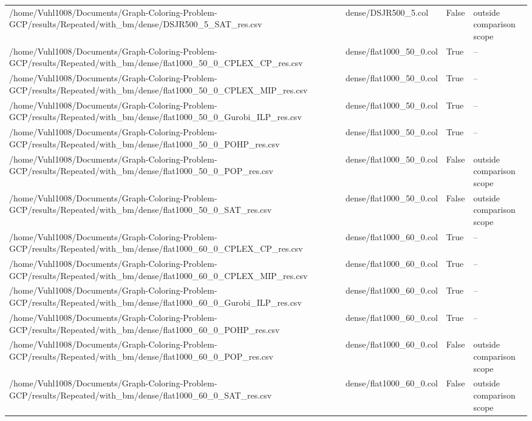 \begin{table}[htbp]
\begin{tabular}{llll}
/home/Vuhl1008/Documents/Graph-Coloring-Problem-GCP/results/Repeated/with\_bm/dense/DSJR500\_5\_SAT\_res.csv & dense/DSJR500\_5.col & False & outside comparison scope \\
/home/Vuhl1008/Documents/Graph-Coloring-Problem-GCP/results/Repeated/with\_bm/dense/flat1000\_50\_0\_CPLEX\_CP\_res.csv & dense/flat1000\_50\_0.col & True & -- \\
/home/Vuhl1008/Documents/Graph-Coloring-Problem-GCP/results/Repeated/with\_bm/dense/flat1000\_50\_0\_CPLEX\_MIP\_res.csv & dense/flat1000\_50\_0.col & True & -- \\
/home/Vuhl1008/Documents/Graph-Coloring-Problem-GCP/results/Repeated/with\_bm/dense/flat1000\_50\_0\_Gurobi\_ILP\_res.csv & dense/flat1000\_50\_0.col & True & -- \\
/home/Vuhl1008/Documents/Graph-Coloring-Problem-GCP/results/Repeated/with\_bm/dense/flat1000\_50\_0\_POHP\_res.csv & dense/flat1000\_50\_0.col & True & -- \\
/home/Vuhl1008/Documents/Graph-Coloring-Problem-GCP/results/Repeated/with\_bm/dense/flat1000\_50\_0\_POP\_res.csv & dense/flat1000\_50\_0.col & False & outside comparison scope \\
/home/Vuhl1008/Documents/Graph-Coloring-Problem-GCP/results/Repeated/with\_bm/dense/flat1000\_50\_0\_SAT\_res.csv & dense/flat1000\_50\_0.col & False & outside comparison scope \\
/home/Vuhl1008/Documents/Graph-Coloring-Problem-GCP/results/Repeated/with\_bm/dense/flat1000\_60\_0\_CPLEX\_CP\_res.csv & dense/flat1000\_60\_0.col & True & -- \\
/home/Vuhl1008/Documents/Graph-Coloring-Problem-GCP/results/Repeated/with\_bm/dense/flat1000\_60\_0\_CPLEX\_MIP\_res.csv & dense/flat1000\_60\_0.col & True & -- \\
/home/Vuhl1008/Documents/Graph-Coloring-Problem-GCP/results/Repeated/with\_bm/dense/flat1000\_60\_0\_Gurobi\_ILP\_res.csv & dense/flat1000\_60\_0.col & True & -- \\
/home/Vuhl1008/Documents/Graph-Coloring-Problem-GCP/results/Repeated/with\_bm/dense/flat1000\_60\_0\_POHP\_res.csv & dense/flat1000\_60\_0.col & True & -- \\
/home/Vuhl1008/Documents/Graph-Coloring-Problem-GCP/results/Repeated/with\_bm/dense/flat1000\_60\_0\_POP\_res.csv & dense/flat1000\_60\_0.col & False & outside comparison scope \\
/home/Vuhl1008/Documents/Graph-Coloring-Problem-GCP/results/Repeated/with\_bm/dense/flat1000\_60\_0\_SAT\_res.csv & dense/flat1000\_60\_0.col & False & outside comparison scope \\

\end{tabular}
\end{table}
